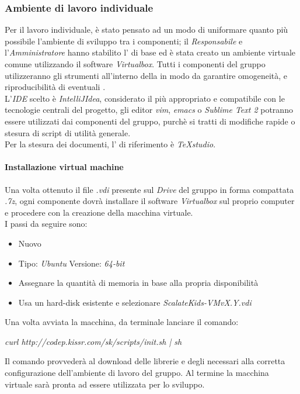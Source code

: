 \documentclass{scalatekids-article}
\begin{document}
\subsubsection{Ambiente di lavoro individuale}
Per il lavoro individuale, è stato pensato ad un modo di uniformare quanto più
possibile l'ambiente di sviluppo tra i componenti; il \textit{Responsabile} e
l'\textit{Amministratore} hanno stabilito l' di base ed è stata creato
un ambiente virtuale comune utilizzando il software \textit{Virtualbox}. Tutti i
componenti del gruppo utilizzeranno gli strumenti all'interno della
 in modo da garantire omogeneità, e riproducibilità di
eventuali .\\ L'\textit{IDE} scelto è \textit{IntelliJIdea}, considerato il
più appropriato e compatibile con le tecnologie centrali del progetto, gli
editor \textit{vim}, \textit{emacs} o \textit{Sublime Text 2} potranno essere
utilizzati dai componenti del gruppo, purchè si tratti di modifiche rapide o
stesura di script di utilità generale.\\
Per la stesura dei documenti, l' di riferimento è \textit{TeXstudio}.
\paragraph{Installazione virtual machine}
Una volta ottenuto il file \textit{.vdi} presente sul \textit{Drive} del gruppo
in forma compattata \textit{.7z}, ogni componente dovrà installare il software
\textit{Virtualbox} sul proprio computer e procedere con la creazione della
macchina virtuale.\\
I passi da seguire sono:
\begin{itemize}
  \item Nuovo
  \item Tipo: \textit{Ubuntu} Versione: \textit{64-bit}
  \item Assegnare la quantità di memoria in base alla propria disponibilità
  \item Usa un hard-disk esistente e selezionare \textit{ScalateKids-VMvX.Y.vdi}
\end{itemize}
Una volta avviata la macchina, da terminale lanciare il comando:
\begin{center}
  \textit{curl http://codep.kissr.com/sk/scripts/init.sh | sh}
\end{center}
Il comando provvederà al download delle librerie e degli 
necessari alla corretta configurazione dell'ambiente di lavoro del gruppo.
Al termine la macchina virtuale sarà pronta ad essere utilizzata per lo sviluppo.
\end{document}
